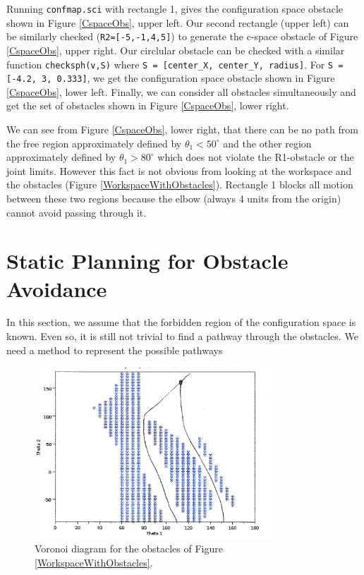 Running {\tt confmap.sci} with rectangle 1, gives the configuration space obstacle shown in Figure \ref{CspaceObs}, upper left.  Our second rectangle (upper left) can be similarly checked ({\tt R2=[-5,-1,4,5]}) to generate the c-space obstacle of Figure \ref{CspaceObs}, upper right. Our circlular obstacle can be checked with a similar function {\tt checksph(v,S)} where {\tt  S = [center\_X, center\_Y, radius]}.  For {\tt S = [-4.2, 3, 0.333]}, we get the configuration space obstacle shown in Figure \ref{CspaceObs}, lower left. Finally, we can consider all obstacles simultaneously and get the set of obstacles shown in Figure \ref{CspaceObs}, lower right.

We can see from Figure \ref{CspaceObs}, lower right, that there can be no path from the free region approximately defined by $\theta_1 < 50^\circ$ and the other region approximately defined by 
$\theta_1 > 80^\circ$ which does not violate the R1-obstacle or the joint limits.   However this fact is not obvious from looking at the workspace and the obstacles (Figure \ref{WorkspaceWithObstacles}).   Rectangle 1 blocks all motion between these two regions because the elbow (always 4 units from the origin) cannot avoid passing through it.


\section{Static Planning for Obstacle Avoidance}

In this section, we assume that the forbidden region of the configuration space is known.   Even so, it is still not trivial to find a pathway through the obstacles.   We need a method to represent the possible pathways 


\begin{figure}
\centering
\includegraphics[width=3.5in]{figs08/voronoi.eps}
\caption{Voronoi diagram for the obstacles of Figure \ref{WorkspaceWithObstacles}.
}\label{Voronoi}
\end{figure}

